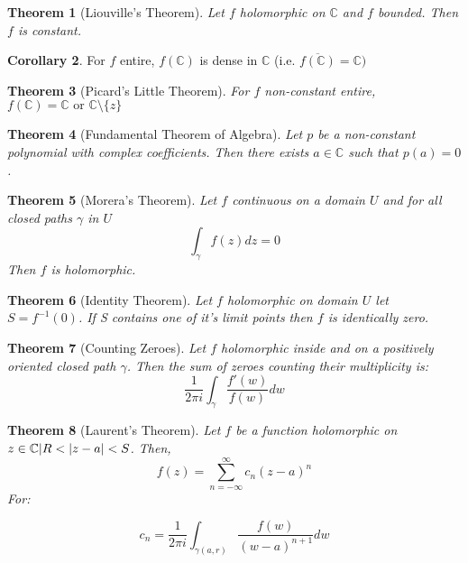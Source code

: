 \documentclass[11pt,a4paper, titlepage]{article}
\newtheorem{theorem}{Theorem}[section]
\DeclarePairedDelimiter\abs{\lvert}{\rvert}
\theoremstyle{definition}
\newtheorem{corollary}[theorem]{Corollary}
\begin{document}
\begin{theorem}[Liouville's Theorem]
Let $f$ holomorphic on $\mathbb{C}$ and $f$ bounded. Then $f$ is constant.
\end{theorem}

\begin{corollary}
For $f$ entire, $f(\mathbb{C})$ is dense in $\mathbb{C}$ (i.e. $\overline {f(\mathbb{C})} = \mathbb{C})$
\end{corollary}

\begin{theorem}[Picard's Little Theorem]
For $f$ non-constant entire, $f(\mathbb{C}) = \mathbb{C} \textrm{ or } \mathbb{C} \setminus \{z\} $
\end{theorem}

\begin{theorem}[Fundamental Theorem of Algebra]

Let $p$ be a non-constant polynomial with complex coefficients. Then there exists $a \in \mathbb{C}$ such that $p(a) = 0$.

\end{theorem}

\begin{theorem}[Morera's Theorem]
Let $f$ continuous on a domain $U$ and for all closed paths $\gamma$ in $U$
\[
	\int_\gamma f(z) dz = 0
\]
Then $f$ is holomorphic.
\end{theorem}


\begin{theorem}[Identity Theorem]
Let $f$ holomorphic on domain $U$ let $S = f^{-1}({0})$. If S contains one of it's limit points then $f$ is identically zero.
\end{theorem}

\begin{theorem}[Counting Zeroes]
Let $f$ holomorphic inside and on a positively oriented closed path $\gamma$. Then the sum of zeroes counting their multiplicity is:
\[
	\frac{1}{2 \pi i} \int_\gamma \frac{f'(w)}{f(w)}dw 
\]
\end{theorem}

\begin{theorem}[Laurent's Theorem]

Let $f$ be a function holomorphic on ${ z \in  \mathbb{C} | R < \abs{z - a} < S}$. Then, 
\[
 	f(z) = \sum_{n = -\infty}^{\infty} c_n (z-a)^n
 \] 
For:

\[
	c_n = \frac{1}{2 \pi i} \int_{\gamma(a,r)} \frac{f(w)}{(w-a)^{n+1}}dw
\]
\end{theorem}
\end{document}
